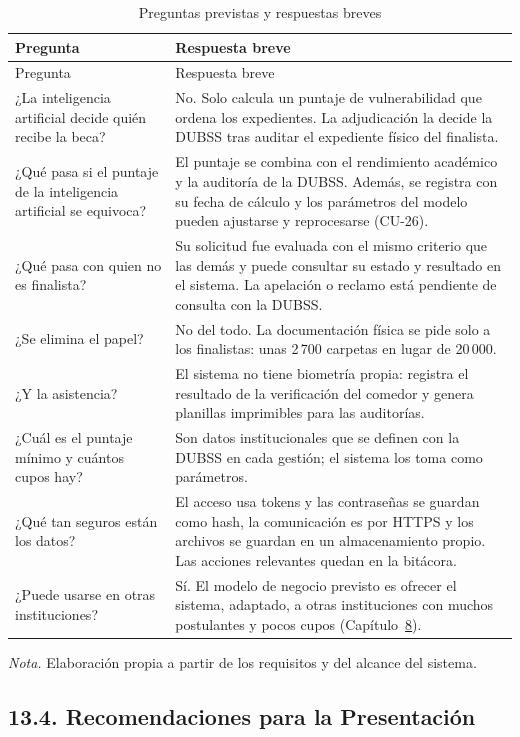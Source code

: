 \begin{longtable}{>{\raggedright\arraybackslash}p{4.8cm} >{\raggedright\arraybackslash}p{8.0cm}}
\caption{Preguntas previstas y respuestas breves}\label{tab:pitch_preguntas}\\
\toprule
Pregunta & Respuesta breve \\
\midrule
\endfirsthead
\toprule
Pregunta & Respuesta breve \\
\midrule
\endhead
\bottomrule
\endfoot
¿La inteligencia artificial decide quién recibe la beca? & No. Solo calcula un puntaje de vulnerabilidad que ordena los expedientes. La adjudicación la decide la DUBSS tras auditar el expediente físico del finalista. \\
¿Qué pasa si el puntaje de la inteligencia artificial se equivoca? & El puntaje se combina con el rendimiento académico y la auditoría de la DUBSS. Además, se registra con su fecha de cálculo y los parámetros del modelo pueden ajustarse y reprocesarse (CU-26). \\
¿Qué pasa con quien no es finalista? & Su solicitud fue evaluada con el mismo criterio que las demás y puede consultar su estado y resultado en el sistema. La apelación o reclamo está pendiente de consulta con la DUBSS. \\
¿Se elimina el papel? & No del todo. La documentación física se pide solo a los finalistas: unas 2\,700 carpetas en lugar de 20\,000. \\
¿Y la asistencia? & El sistema no tiene biometría propia: registra el resultado de la verificación del comedor y genera planillas imprimibles para las auditorías. \\
¿Cuál es el puntaje mínimo y cuántos cupos hay? & Son datos institucionales que se definen con la DUBSS en cada gestión; el sistema los toma como parámetros. \\
¿Qué tan seguros están los datos? & El acceso usa tokens y las contraseñas se guardan como hash, la comunicación es por HTTPS y los archivos se guardan en un almacenamiento propio. Las acciones relevantes quedan en la bitácora. \\
¿Puede usarse en otras instituciones? & Sí. El modelo de negocio previsto es ofrecer el sistema, adaptado, a otras instituciones con muchos postulantes y pocos cupos (Capítulo~\hyperref[cap:mercado]{8}). \\
\end{longtable}
\noindent\textit{Nota.} Elaboración propia a partir de los requisitos y del alcance del sistema.

\subsection{13.4. Recomendaciones para la Presentación}


